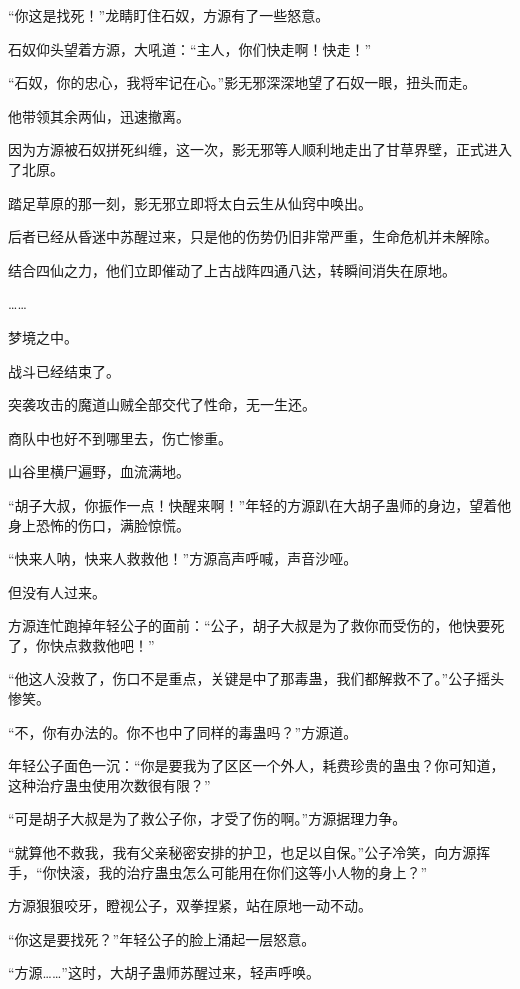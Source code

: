 
\begin{this_body}

“你这是找死！”龙睛盯住石奴，方源有了一些怒意。

石奴仰头望着方源，大吼道：“主人，你们快走啊！快走！”

“石奴，你的忠心，我将牢记在心。”影无邪深深地望了石奴一眼，扭头而走。

他带领其余两仙，迅速撤离。

因为方源被石奴拼死纠缠，这一次，影无邪等人顺利地走出了甘草界壁，正式进入了北原。

踏足草原的那一刻，影无邪立即将太白云生从仙窍中唤出。

后者已经从昏迷中苏醒过来，只是他的伤势仍旧非常严重，生命危机并未解除。

结合四仙之力，他们立即催动了上古战阵四通八达，转瞬间消失在原地。

……

梦境之中。

战斗已经结束了。

突袭攻击的魔道山贼全部交代了性命，无一生还。

商队中也好不到哪里去，伤亡惨重。

山谷里横尸遍野，血流满地。

“胡子大叔，你振作一点！快醒来啊！”年轻的方源趴在大胡子蛊师的身边，望着他身上恐怖的伤口，满脸惊慌。

“快来人呐，快来人救救他！”方源高声呼喊，声音沙哑。

但没有人过来。

方源连忙跑掉年轻公子的面前：“公子，胡子大叔是为了救你而受伤的，他快要死了，你快点救救他吧！”

“他这人没救了，伤口不是重点，关键是中了那毒蛊，我们都解救不了。”公子摇头惨笑。

“不，你有办法的。你不也中了同样的毒蛊吗？”方源道。

年轻公子面色一沉：“你是要我为了区区一个外人，耗费珍贵的蛊虫？你可知道，这种治疗蛊虫使用次数很有限？”

“可是胡子大叔是为了救公子你，才受了伤的啊。”方源据理力争。

“就算他不救我，我有父亲秘密安排的护卫，也足以自保。”公子冷笑，向方源挥手，“你快滚，我的治疗蛊虫怎么可能用在你们这等小人物的身上？”

方源狠狠咬牙，瞪视公子，双拳捏紧，站在原地一动不动。

“你这是要找死？”年轻公子的脸上涌起一层怒意。

“方源……”这时，大胡子蛊师苏醒过来，轻声呼唤。


\end{this_body}
